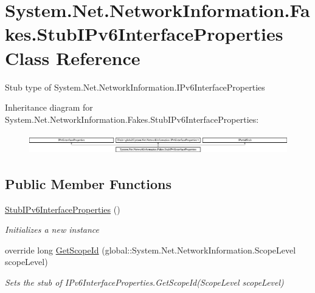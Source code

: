 \hypertarget{class_system_1_1_net_1_1_network_information_1_1_fakes_1_1_stub_i_pv6_interface_properties}{\section{System.\-Net.\-Network\-Information.\-Fakes.\-Stub\-I\-Pv6\-Interface\-Properties Class Reference}
\label{class_system_1_1_net_1_1_network_information_1_1_fakes_1_1_stub_i_pv6_interface_properties}
}


Stub type of System.\-Net.\-Network\-Information.\-I\-Pv6\-Interface\-Properties 


Inheritance diagram for System.\-Net.\-Network\-Information.\-Fakes.\-Stub\-I\-Pv6\-Interface\-Properties\-:\begin{figure}[H]
\begin{center}
\leavevmode
\includegraphics[height=0.884676cm]{class_system_1_1_net_1_1_network_information_1_1_fakes_1_1_stub_i_pv6_interface_properties}
\end{center}
\end{figure}
\subsection*{Public Member Functions}
\begin{DoxyCompactItemize}
\item 
\hyperlink{class_system_1_1_net_1_1_network_information_1_1_fakes_1_1_stub_i_pv6_interface_properties_ab0b990c915209412e6a8af7064e87263}{Stub\-I\-Pv6\-Interface\-Properties} ()
\begin{DoxyCompactList}\small\item\em Initializes a new instance\end{DoxyCompactList}\item 
override long \hyperlink{class_system_1_1_net_1_1_network_information_1_1_fakes_1_1_stub_i_pv6_interface_properties_a6c0b185241f56e51d21eaa80195d2f44}{Get\-Scope\-Id} (global\-::\-System.\-Net.\-Network\-Information.\-Scope\-Level scope\-Level)
\begin{DoxyCompactList}\small\item\em Sets the stub of I\-Pv6\-Interface\-Properties.\-Get\-Scope\-Id(\-Scope\-Level scope\-Level)\end{DoxyCompactList}\end{DoxyCompactItemize}
